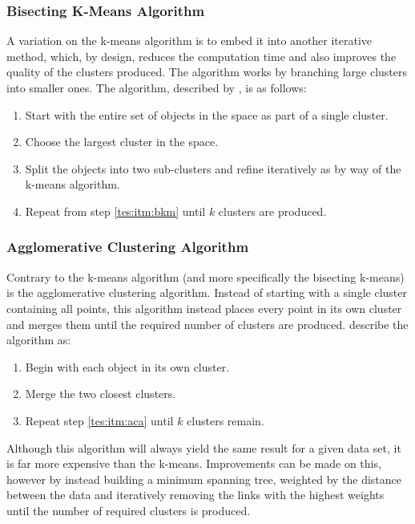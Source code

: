 \subsubsection{Bisecting K-Means Algorithm}\label{tes:ssec:bkma}
A variation on the k-means algorithm is to embed it into another iterative method, which, by design, reduces the computation time and also improves the quality of the clusters produced. The algorithm works by branching large clusters into smaller ones. The algorithm, described by \citet{steinbach2000comparison}, is as follows:
\begin{enumerate}
  \item Start with the entire set of objects in the space as part of a single cluster.
  \item\label{tes:itm:bkm} Choose the largest cluster in the space.
  \item Split the objects into two sub-clusters and refine iteratively as by way of the k-means algorithm.
  \item Repeat from step \ref{tes:itm:bkm} until $k$ clusters are produced.
\end{enumerate}
%
\subsubsection{Agglomerative Clustering Algorithm}
Contrary to the k-means algorithm (and more specifically the bisecting k-means) is the agglomerative clustering algorithm. Instead of starting with a single cluster containing all points, this algorithm instead places every point in its own cluster and merges them until the required number of clusters are produced. \citet{way2012advances} describe the algorithm as:
\begin{enumerate}
  \item Begin with each object in its own cluster.
  \item\label{tes:itm:aca} Merge the two closest clusters.
  \item Repeat step \ref{tes:itm:aca} until $k$ clusters remain.
\end{enumerate}
Although this algorithm will always yield the same result for a given data set, it is far more expensive than the k-means. Improvements can be made on this, however by instead building a minimum spanning tree, weighted by the distance between the data and iteratively removing the links with the highest weights until the number of required clusters is produced.
